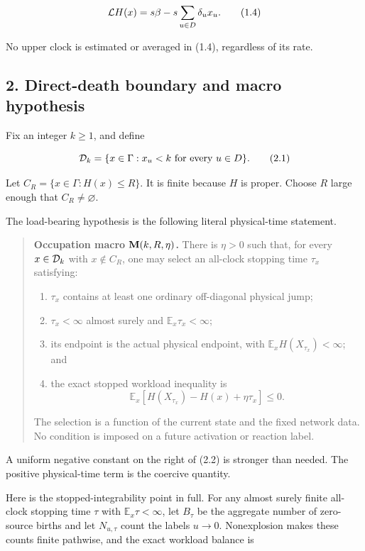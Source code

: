 \[
                 {\cal L}H(x)=s\beta
                    -s\sum_{u\in D}\delta_u x_u.        \tag{1.4}
\]

No upper clock is estimated or averaged in (1.4), regardless of its
rate.

\subsection{2. Direct-death boundary and macro
hypothesis}

Fix an integer \(k\ge1\), and define

\[
             {\cal D}_k=\{x\in\Gamma:x_u<k
                              \text{ for every }u\in D\}. \tag{2.1}
\]

Let \(C_R=\{x\in\Gamma:H(x)\le R\}\). It is finite because \(H\) is
proper. Choose \(R\) large enough that \(C_R\ne\varnothing\).

The load-bearing hypothesis is the following literal physical-time
statement.

\begin{quote}
\textbf{Occupation macro \({\bf M}(k,R,\eta)\).} There is \(\eta>0\)
such that, for every \(x\in{\cal D}_k\) with \(x\notin C_R\), one may
select an all-clock stopping time \(\tau_x\) satisfying:

\begin{enumerate}
\def\labelenumi{\arabic{enumi}.}
\tightlist
\item
  \(\tau_x\) contains at least one ordinary off-diagonal physical jump;
\item
  \(\tau_x<\infty\) almost surely and \({\mathbb E}_x\tau_x<\infty\);
\item
  its endpoint is the actual physical endpoint, with
  \({\mathbb E}_xH(X_{\tau_x})<\infty\); and
\item
  the exact stopped workload inequality is \[
     {\mathbb E}_x\!\left[
        H(X_{\tau_x})-H(x)+\eta\tau_x\right]\le0.  \tag{2.2}
  \]
\end{enumerate}

The selection is a function of the current state and the fixed network
data. No condition is imposed on a future activation or reaction label.
\end{quote}

A uniform negative constant on the right of (2.2) is stronger than
needed. The positive physical-time term is the coercive quantity.

Here is the stopped-integrability point in full. For any almost surely
finite all-clock stopping time \(\tau\) with
\({\mathbb E}_x\tau<\infty\), let \(B_\tau\) be the aggregate number of
zero-source births and let \(N_{u,\tau}\) count the labels \(u\to0\).
Nonexplosion makes these counts finite pathwise, and the exact workload
balance is

